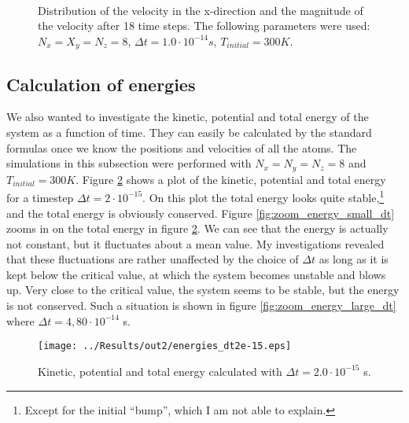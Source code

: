 \documentclass[12pt]{article}
\begin{document}
\begin{figure}[!ht]
    \begin{center}
        \hspace{5mm}
        \\ 
    \end{center}
    \caption{Distribution of the velocity in the x-direction and the magnitude of the velocity after 18 time steps. The following parameters were used: $N_x = X_y = N_z = 8$,
              $\Delta t = 1.0\cdot 10^{-14} s$, $T_{initial} = 300 K$.}
    \label{fig:histState18}
\end{figure}


\subsection{Calculation of energies}

We also wanted to investigate the kinetic, potential and total energy of the system as a function of time. They can easily be calculated by the standard formulas once we know the positions and
velocities of all the atoms. The simulations in this subsection were performed with $N_x = N_y = N_z = 8$ and $T_{initial} = 300K$. Figure \ref{fig:energies} shows a plot of the kinetic, potential and total
energy for a timestep $\Delta t = 2\cdot10^{-15}$. On this plot the total energy looks quite stable,\footnote{Except for the initial ``bump'', which I am not able to explain.} and the total energy
is obviously conserved. Figure \ref{fig:zoom_energy_small_dt} zooms in on the total energy in figure \ref{fig:energies}. We can see that the energy is actually not constant, but it fluctuates about a mean value. My investigations revealed that
these fluctuations are rather unaffected by the choice of $\Delta t$ as long as it is kept below the critical value, at which the system becomes unstable and blows up. Very close to the critical value,
the system seems to be stable, but the energy is not conserved. Such a situation is shown in figure \ref{fig:zoom_energy_large_dt} where $\Delta t = 4,80\cdot10^{-14}$ s.

\begin{figure}[!ht]
 \begin{center}
  \texttt{[image: ../Results/out2/energies\_dt2e-15.eps]}
  \caption{Kinetic, potential and total energy calculated with $\Delta t = 2.0\cdot10^{-15}$ s.}
  \label{fig:energies}
 \end{center}
\end{figure}
\end{document}
